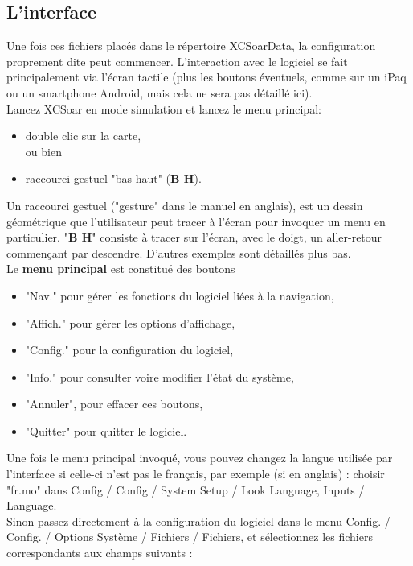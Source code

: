 \documentclass{article}
\begin{document}
\subsection{L'interface}
\noindent
%
Une fois ces fichiers placés dans le répertoire XCSoarData, la configuration proprement dite peut commencer. L'interaction avec le logiciel se fait principalement via l'écran tactile (plus les boutons éventuels, comme sur un iPaq ou un smartphone Android, mais cela ne sera pas détaillé ici).\\
%
\newline
%
Lancez XCSoar en mode simulation et lancez le menu principal:
\begin{itemize}
\item double clic sur la carte,\\
ou bien
\item raccourci gestuel "bas-haut" (\textbf{B H}).
\end{itemize}
Un raccourci gestuel ("gesture" dans le manuel en anglais), est un dessin géométrique que l'utilisateur peut tracer à l'écran pour invoquer un menu en particulier. "\textbf{B H}" consiste à tracer sur l'écran, avec le doigt, un aller-retour commençant par descendre. D'autres exemples sont détaillés plus bas.\\
%
\newline
%
Le \textbf{menu principal} est constitué des boutons
\begin{itemize}
\item "Nav." pour gérer les fonctions du logiciel liées à la navigation,
\item "Affich." pour gérer les options d'affichage,
\item "Config." pour la configuration du logiciel,
\item "Info." pour consulter voire modifier l'état du système,
\item "Annuler", pour effacer ces boutons,
\item "Quitter" pour quitter le logiciel.
\end{itemize}
%
Une fois le menu principal invoqué, vous pouvez changez la langue utilisée par l'interface si celle-ci n'est pas le français, par exemple (si en anglais) : choisir "fr.mo" dans Config / Config / System Setup / Look Language, Inputs / Language.\\
%
\newline
%
Sinon passez directement à la configuration du logiciel dans le menu Config. / Config. / Options Système / Fichiers / Fichiers, et sélectionnez les fichiers correspondants aux champs suivants :
\end{document}

